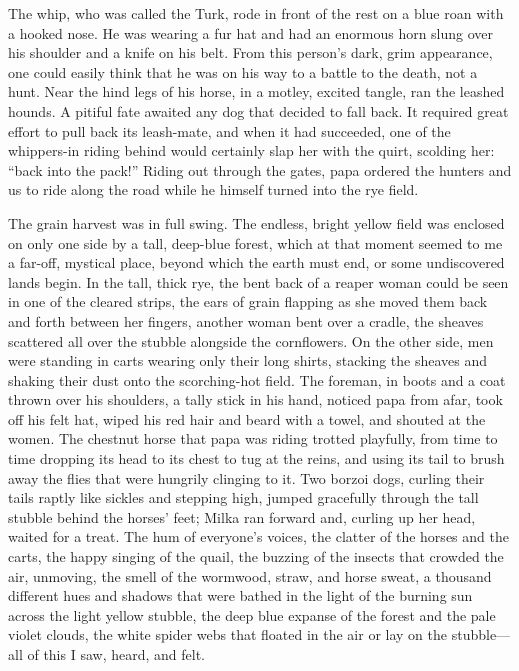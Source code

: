 The whip, who was called the Turk,  rode in front of the rest on a blue roan with a hooked nose. He was wearing a fur hat and had an enormous horn slung over his shoulder and a knife on his belt. From this person's dark, grim appearance, one could easily think that he was on his way to a battle to the death, not a hunt. Near the hind legs of his horse, in a motley, excited tangle, ran the leashed hounds. A pitiful fate awaited any dog that decided to fall back. It required great effort to pull back its leash-mate, and when it had succeeded, one of the whippers-in riding behind would certainly slap her with the quirt, scolding her: ``back into the pack!'' Riding out through the gates, papa ordered the hunters and us to ride along the road while he himself turned into the rye field.

The grain harvest was in full swing. The endless, bright yellow field was enclosed on only one side by a tall, deep-blue forest, which at that moment seemed to me a far-off, mystical place, beyond which the earth must end, or some undiscovered lands begin. In the tall, thick rye, the bent back of a reaper woman could be seen in one of the cleared strips, the ears of grain flapping as she moved them back and forth between her fingers, another woman bent over a cradle, the sheaves scattered all over the stubble alongside the cornflowers. On the other side, men were standing in carts wearing only their long shirts, stacking the sheaves and shaking their dust onto the scorching-hot field. The foreman, in boots and a coat thrown over his shoulders, a tally stick in his hand, noticed papa from afar, took off his felt hat, wiped his red hair and beard with a towel, and shouted at the women. The chestnut horse that papa was riding trotted playfully, from time to time dropping its head to its chest to tug at the reins, and using its tail to brush away the flies that were hungrily clinging to it. Two borzoi dogs, curling their tails raptly like sickles and stepping high, jumped gracefully through the tall stubble behind the horses' feet; Milka ran forward and, curling up her head, waited for a treat. The hum of everyone's voices, the clatter of the horses and the carts, the happy singing of the quail, the buzzing of the insects that crowded the air, unmoving, the smell of the wormwood,  straw, and horse sweat, a thousand different hues and shadows that were bathed in the light of the burning sun across the light yellow stubble, the deep blue expanse of the forest and the pale violet clouds, the white spider webs that floated in the air or lay on the stubble---all of this I saw, heard, and felt.

